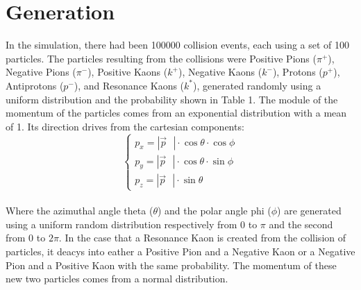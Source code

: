 \documentclass[a4paper, 11pt]{article}
\begin{document}
    \section{Generation}
      In the simulation, there had been 100000 collision events, each using a set of 100 particles. The particles resulting from the collisions were Positive Pions ($\pi^+$), Negative Pions ($\pi^-$), Positive Kaons ($k^+$), Negative Kaons ($k^-$), Protons ($p^+$), Antiprotons ($p^-$), and Resonance Kaons ($k^*$), generated randomly using a uniform distribution and the probability shown in Table 1.  The module of the momentum of the particles comes from an exponential distribution with a mean of 1. Its direction drives from the cartesian components:
      \begin{equation}
        \begin{cases}
          p_x = |\vec{p} \mbox{ } | \cdot \cos \theta \cdot \cos \phi\\
          p_y = |\vec{p} \mbox{ } | \cdot \cos \theta \cdot \sin \phi\\
          p_z = |\vec{p} \mbox{ } | \cdot \sin \theta
        \end{cases}
      \end{equation}\\
      Where the azimuthal angle theta ($\theta$) and the polar angle phi ($\phi$) are generated using a uniform random distribution respectively from 0 to $\pi$ and the second from 0 to $2\pi$.
      In the case that a Resonance Kaon is created from the collision of particles, it deacys into eather a Positive Pion and a Negative Kaon or a Negative Pion and a Positive Kaon with the same probability. The momentum of these new two particles comes from a normal distribution.
\end{document}
